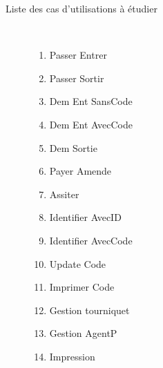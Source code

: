     \begin{description}
        \item[Liste des cas d'utilisations à étudier] \hfill \\
        \item[] \begin{minipage}[t]{0.5\textwidth}
            \begin{enumerate}
                \item Passer Entrer
                \item Passer Sortir
                \item Dem Ent SansCode
                \item Dem Ent AvecCode
                \item Dem Sortie
                \item Payer Amende
                \item Assiter
            \end{enumerate}
        \end{minipage}
        \hfill
        \begin{minipage}[t]{0.4\textwidth}
            \begin{enumerate}
                \setcounter{enumi}{7}
                \item Identifier AvecID
                \item Identifier AvecCode
                \item Update Code
                \item Imprimer Code
                \item Gestion tourniquet
                \item Gestion AgentP
                \item Impression
            \end{enumerate}
        \end{minipage}
    \end{description}
    \pagebreak